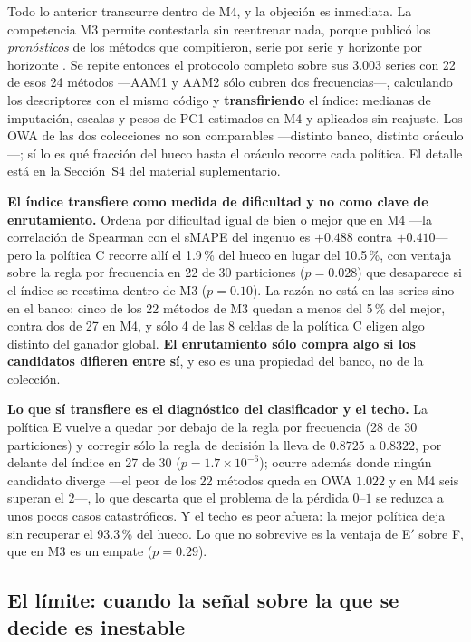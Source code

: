 Todo lo anterior transcurre dentro de M4, y la objeción es inmediata. La competencia M3
\cite{makridakis2000} permite contestarla sin reentrenar nada, porque publicó los
\emph{pronósticos} de los métodos que compitieron, serie por serie y horizonte por
horizonte \cite{mcomp}. Se repite entonces el protocolo completo sobre sus 3.003 series
con 22 de esos 24 métodos ---AAM1 y AAM2 sólo cubren dos frecuencias---, calculando los
descriptores con el mismo código y \textbf{transfiriendo} el índice: medianas de
imputación, escalas y pesos de PC1 estimados en M4 y aplicados sin reajuste. Los OWA de
las dos colecciones no son comparables ---distinto banco, distinto oráculo---; sí lo es
qué fracción del hueco hasta el oráculo recorre cada política. El detalle está en la
Sección~S4 del material suplementario.

\textbf{El índice transfiere como medida de dificultad y no como clave de enrutamiento.}
Ordena por dificultad igual de bien o mejor que en M4 ---la correlación de Spearman con el
sMAPE del ingenuo es $+0.488$ contra $+0.410$--- pero la política C recorre allí el
1.9\,\% del hueco en lugar del 10.5\,\%, con ventaja sobre la regla por frecuencia en 22
de 30 particiones ($p=0.028$) que desaparece si el índice se reestima dentro de M3
($p=0.10$). La razón no está en las series sino en el banco: cinco de los 22 métodos de M3
quedan a menos del 5\,\% del mejor, contra dos de 27 en M4, y sólo 4 de las 8 celdas de la
política C eligen algo distinto del ganador global. \textbf{El enrutamiento sólo compra
algo si los candidatos difieren entre sí}, y eso es una propiedad del banco, no de la
colección.

\textbf{Lo que sí transfiere es el diagnóstico del clasificador y el techo.} La política E
vuelve a quedar por debajo de la regla por frecuencia (28 de 30 particiones) y corregir
sólo la regla de decisión la lleva de $0.8725$ a $0.8322$, por delante del índice en 27 de
30 ($p=1.7\times10^{-6}$); ocurre además donde ningún candidato diverge ---el peor de los
22 métodos queda en OWA $1.022$ y en M4 seis superan el $2$---, lo que descarta que el
problema de la pérdida $0$--$1$ se reduzca a unos pocos casos catastróficos. Y el techo es
peor afuera: la mejor política deja sin recuperar el 93.3\,\% del hueco. Lo que no
sobrevive es la ventaja de E$'$ sobre F, que en M3 es un empate ($p=0.29$).

\subsection{El límite: cuando la señal sobre la que se decide es
inestable}\label{sec:semillas}

